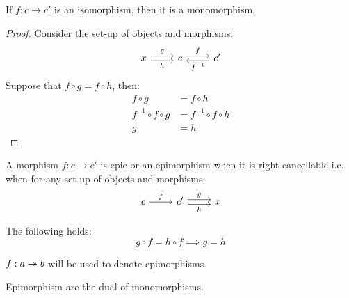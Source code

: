 \begin{theorem}
  If $f:c\to c'$ is an isomorphism, then it is a monomorphism.

  \begin{proof}
    Consider the set-up of objects and morphisms:
    \[\begin{tikzcd}[ampersand replacement=\&]
      x \& c \& {c'}
      \arrow["f", shift left=1, from=1-2, to=1-3]
      \arrow["g", shift left=1, from=1-1, to=1-2]
      \arrow["h"', shift right=1, from=1-1, to=1-2]
      \arrow["{f^{-1}}", shift left=1, from=1-3, to=1-2]
    \end{tikzcd}\]
    Suppose that $f\circ g = f\circ h$, then:
    \[
      \begin{aligned}
        f\circ g &= f\circ h\\
        f^{-1}\circ f\circ g &= f^{-1}\circ f\circ h\\
        g &= h
      \end{aligned}
    \]
  \end{proof}
\end{theorem}

\begin{definition}
  A morphism $f:c\to c'$ is epic or an epimorphism when it is right cancellable
  \parencite{lane:working_mathematician} i.e. when for any set-up of objects and
  morphisms:
  \[\begin{tikzcd}[ampersand replacement=\&]
    c \& {c'} \& x
    \arrow["h"', shift right=1, from=1-2, to=1-3]
    \arrow["f", from=1-1, to=1-2]
    \arrow["g", shift left=1, from=1-2, to=1-3]
  \end{tikzcd}\]

  The following holds:
  \[g \circ f = h \circ f \implies g = h\]
\end{definition}

\begin{remark}
  $f:a\twoheadrightarrow b$ will be used to denote epimorphisms.
\end{remark}

\begin{remark}
  Epimorphism are the dual of monomorphisms.
\end{remark}

